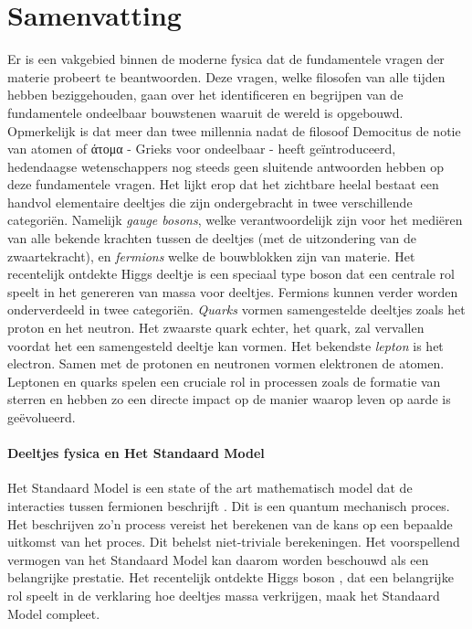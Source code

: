\chapter*{Samenvatting}

Er is een vakgebied binnen de moderne fysica dat de fundamentele vragen der materie probeert te beantwoorden.
Deze vragen, welke filosofen van alle tijden hebben beziggehouden, gaan over het identificeren en begrijpen
van de fundamentele ondeelbaar bouwstenen waaruit de wereld is opgebouwd. Opmerkelijk is dat meer dan twee
millennia nadat de filosoof Democitus de notie van atomen of \textgreek{άτομα} - Grieks voor ondeelbaar -  heeft ge\"introduceerd,
hedendaagse wetenschappers nog steeds geen sluitende antwoorden hebben op deze fundamentele vragen. Het lijkt erop dat het
zichtbare heelal bestaat een handvol elementaire deeltjes die zijn ondergebracht in twee verschillende categori\"en. Namelijk
{\it gauge bosons}, welke verantwoordelijk zijn voor het medi\"eren van alle bekende krachten tussen de deeltjes
(met de uitzondering van de zwaartekracht), en {\it fermions} welke de bouwblokken zijn van materie. Het recentelijk ontdekte
Higgs deeltje \cite{higgs-cms,higgs-atlas} is een speciaal type boson dat een centrale rol speelt in het genereren van massa
voor deeltjes. Fermions kunnen verder worden onderverdeeld in twee categori\"en. {\it Quarks} vormen samengestelde deeltjes
zoals het proton en het neutron. Het zwaarste quark echter, het \tquark quark, zal vervallen voordat het een samengesteld
deeltje kan vormen. Het bekendste {\it lepton} is het electron. Samen met de protonen en neutronen vormen elektronen de atomen.
Leptonen en quarks spelen een cruciale rol in processen zoals de formatie van sterren en hebben zo een directe impact op de
manier waarop leven op aarde is ge\"evolueerd.

\subsubsection{Deeltjes fysica en Het Standaard Model}
Het Standaard Model is een state of the art mathematisch model dat de interacties tussen fermionen
beschrijft \cite{sm-glashow,sm-weinberg,sm-salam}. Dit is een quantum mechanisch proces.
Het beschrijven zo'n process vereist het berekenen van de kans op een bepaalde uitkomst van het proces.
Dit behelst niet-triviale berekeningen. Het voorspellend vermogen van het Standaard Model kan daarom
worden beschouwd als een belangrijke prestatie. Het recentelijk ontdekte Higgs boson \cite{higgs-cms,higgs-atlas},
dat een belangrijke rol speelt in de verklaring hoe deeltjes massa verkrijgen, maak het Standaard Model compleet.

